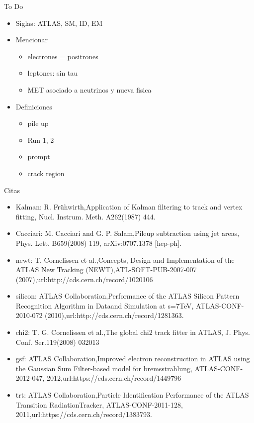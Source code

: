 
{\LARGE To Do}

\begin{itemize}
	\item Siglas: ATLAS, SM, ID, EM
	\item Mencionar
	\begin{itemize}
		\item electrones = positrones
		\item leptones: sin tau
		\item MET asociado a neutrinos y nueva fisica
	\end{itemize}
	\item Definiciones
	\begin{itemize}
		\item pile up
		\item Run 1, 2
		\item prompt
		\item crack region
	\end{itemize}
\end{itemize}


\vspace{2cm}


{\LARGE Citas}

\begin{itemize}
	\item Kalman: R. Frühwirth,Application of Kalman filtering to track and vertex fitting, Nucl. Instrum. Meth. A262(1987) 444.
	\item Cacciari: M. Cacciari and G. P. Salam,Pileup subtraction using jet areas, Phys. Lett. B659(2008) 119, arXiv:0707.1378 [hep-ph].
	\item newt: T. Cornelissen et al.,Concepts, Design and Implementation of the ATLAS New Tracking (NEWT),ATL-SOFT-PUB-2007-007 (2007),url:http://cds.cern.ch/record/1020106
	\item silicon: ATLAS Collaboration,Performance of the ATLAS Silicon Pattern Recognition Algorithm in Dataand Simulation at s=7TeV, ATLAS-CONF-2010-072 (2010),url:http://cds.cern.ch/record/1281363.
	\item chi2: T. G. Cornelissen et al.,The global chi2 track fitter in ATLAS, J. Phys. Conf. Ser.119(2008) 032013
	\item gsf: ATLAS Collaboration,Improved electron reconstruction in ATLAS using the Gaussian Sum Filter-based model for bremsstrahlung, ATLAS-CONF-2012-047, 2012,url:https://cds.cern.ch/record/1449796
	\item trt: ATLAS Collaboration,Particle Identification Performance of the ATLAS Transition RadiationTracker, ATLAS-CONF-2011-128, 2011,url:https://cds.cern.ch/record/1383793.
\end{itemize}


